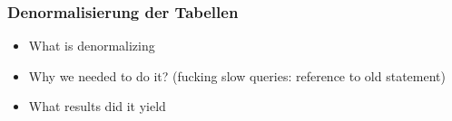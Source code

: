 \subsubsection{Denormalisierung der Tabellen}
\label{ssub:denormalisierung_der_tabellen}
  \begin{itemize}
    \item What is denormalizing
    \item Why we needed to do it? (fucking slow queries: reference to old statement)
    \item What results did it yield
  \end{itemize}
